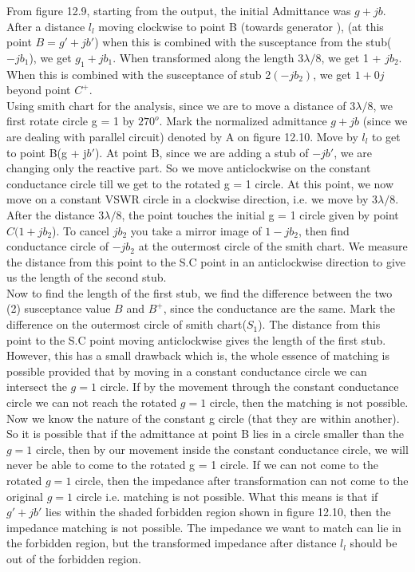 \begin{enumerate}[(i)]
From figure 12.9, starting from the output, the initial Admittance was $g + jb$. After a distance $l_l$ moving clockwise to point B (towards generator ), (at this point $B = g' + jb'$) when this is combined with the susceptance from the stub($-jb_1$), we get $g_1 +jb_1$. When transformed along the length $3\lambda/8$, we get 1 + $jb_2$. When this is combined with the susceptance of stub 2$(-jb_2)$, we get $1 + 0j$ beyond point $C^+$.\\

Using smith chart for the analysis, since we are to move a distance of $3\lambda/8$, we first rotate circle g = 1  by $270^o$. Mark the normalized admittance $g + jb$  (since we are dealing with parallel circuit) denoted by A on figure 12.10. Move by $l_l$ to get to point B(g + j$b'$). At point B, since we are adding a stub of $-jb'$, we are changing only the reactive part. So we move anticlockwise on the constant conductance circle till we get to the rotated g = 1 circle. At this point, we now move on a constant VSWR circle in a clockwise direction, i.e. we move by $ 3\lambda/8$. After the distance $ 3\lambda/8$, the point touches the initial g = 1 circle given by point $C (1+ jb_2$). To cancel $jb_2$ you take a mirror image of $1-jb_2$, then find conductance circle of $ -jb_2$ at the outermost circle of the smith chart. We measure the distance from this point to the S.C point in an anticlockwise direction to give us the length of the second stub.\\

Now to find the length of the first stub, we find the difference between the two (2) susceptance value $B$ and $B^+$, since the conductance are the same. Mark the difference on the outermost circle of smith chart($S_1$). The distance from this point to the S.C point moving anticlockwise gives the length of the first stub. \\

However, this has a small drawback which is, the whole essence of matching is possible provided that by moving in a constant conductance circle we can intersect the $g = 1$ circle. If by the movement through the constant conductance circle we can not reach the rotated $g = 1$ circle, then the matching is not possible. Now we know the nature of the constant g circle (that they are within another). So it is possible that if the admittance at point B lies in a circle smaller than the $g = 1$ circle, then by our movement inside the constant conductance circle, we will never be able to come to the rotated g = 1 circle. If we can not come to the rotated $g = 1$ circle, then the impedance after transformation can not come to the original $g =1$ circle i.e. matching is not possible. What this means is that if $g' + jb'$ lies within the shaded forbidden region shown in figure 12.10, then the impedance matching is not possible. The impedance we want to match can lie in the forbidden region, but the transformed impedance after distance $ l_l$ should be out of the forbidden region.\\


\end{enumerate}
